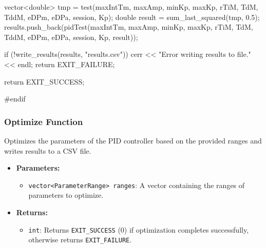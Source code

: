 \documentclass[a4paper,12pt]{article}
\begin{document}
\begin{lstlising}[language=C++]
{{{{{{{{{{{                                                                                        {
                                                                                                vector<double> tmp = test(maxIntTm, maxAmp, minKp, maxKp, rTiM, TdM, TddM, eDPm, eDPa, session, Kp);
                                                                                                double result = sum_last_squared(tmp, 0.5);
                                                                                                results.push_back(pidTest({maxIntTm, maxAmp, minKp, maxKp, rTiM, TdM, TddM, eDPm, eDPa, session, Kp, result}));
                                                                                        }
                                                                                }
                                                                        }
                                                                }
                                                        }
                                                }
                                        }
                                }
                        }
                }
        }

        if (!write_results(results, "results.csv"))
        {
                cerr << "Error writing results to file." << endl;
                return EXIT_FAILURE;
        }

        return EXIT_SUCCESS;
}

#endif
\end{lstlising}
\subsubsection{Optimize Function}
Optimizes the parameters of the PID controller based on the provided ranges and writes results to a CSV file.
\begin{itemize}
\item \textbf{Parameters:}
\begin{itemize}
\item \texttt{vector<ParameterRange> ranges}: A vector containing the ranges of parameters to optimize.
\end{itemize}
\item \textbf{Returns:}
\begin{itemize}
\item \texttt{int}: Returns \texttt{EXIT\_SUCCESS} (0) if optimization completes successfully, otherwise returns \texttt{EXIT\_FAILURE}.
\end{itemize}
\end{itemize}
\end{document}
